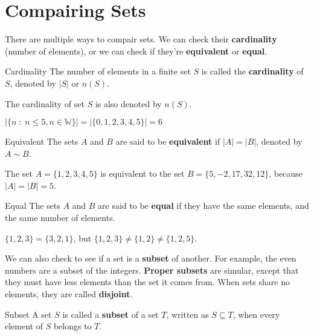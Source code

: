 \section{Compairing Sets}

There are multiple ways to compair sets. We can check their {\bf cardinality} (number of elements), or we can check if they're {\bf equivalent} or {\bf equal}.

\begin{boxdefine}{Cardinality}{}
	The number of elements in a finite set $S$ is called the {\bf cardinality} of $S$, denoted by $|S|$ or $n(S)$.
\end{boxdefine}

\begin{boxnotation*}{}{}
	The cardinality of set $S$ is also denoted by $n(S)$.
\end{boxnotation*}

\begin{boxexample}{}{}
	$|\{ n \;:\; n \leq 5, n \in \mathbb{W}\}| = |\{0,1,2,3,4,5\}| = 6$
\end{boxexample}


\begin{boxdefine}{Equivalent}{}
	The sets $A$ and $B$ are said to be {\bf equivalent} if $|A| = |B|$, denoted by $A \sim B$.
\end{boxdefine}

\begin{boxexample}{}{}
	The set $A = \{1,2,3,4,5\}$ is equivalent to the set $B = \{5,-2,17,32,12\}$, because $|A| = |B| = 5$.
\end{boxexample}


\begin{boxdefine}{Equal}{}
	The sets $A$ and $B$ are said to be {\bf equal} if they have the same elements, and the same number of elements.
\end{boxdefine}

\begin{boxexample}{}{}
	$\{1,2,3\} = \{3,2,1\}$, but $\{1,2,3\} \ne \{1,2\} \ne \{1,2,5\}$.
\end{boxexample}

We can also check to see if a set is a {\bf subset} of another. For example, the even numbers are a subset of the integers. {\bf Proper subsets} are simular, except that they must have less elements than the set it comes from. When sets share no elements, they are called {\bf disjoint}.

\begin{boxdefine}{Subset}{}
	A set $S$ is called a {\bf subset} of a set $T$, written as $S \subseteq T$, when every element of $S$ belongs to $T$.
\end{boxdefine}

